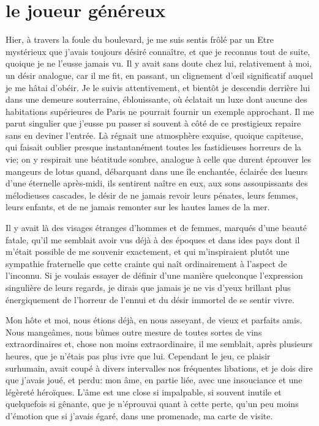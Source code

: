 \quebra\section[Le joueur généreux]{le joueur généreux}

Hier, à travers la foule du boulevard, je me suis sentis frôlé par un
Etre mystérieux que j’avais toujours désiré connaître,
et que je reconnus tout de suite, quoique je ne
l’eusse jamais vu. Il y avait sans doute chez lui,
relativement à moi, un désir analogue, car il me fit, en passant, un
clignement d’\oe il significatif auquel je me hâtai
d’obéir. Je le suivis attentivement, et bientôt je
descendis derrière lui dans une demeure souterraine, éblouissante, où
éclatait un luxe dont aucune des habitations supérieures de Paris ne
pourrait fournir un exemple approchant. Il me parut singulier que
j’eusse pu passer si souvent à côté de ce prestigieux
repaire sans en deviner l’entrée. Là régnait une
atmosphère exquise, quoique capiteuse, qui faisait oublier presque
instantanément toutes les fastidieuses horreurs de la vie; on y
respirait une béatitude sombre, analogue à celle que durent éprouver
les mangeurs de lotus quand, débarquant dans une île enchantée,
éclairée des lueurs d’une éternelle après{}-midi, ils
sentirent naître en eux, aux sons assoupissants des mélodieuses
cascades, le désir de ne jamais revoir leurs pénates, leurs femmes,
leurs enfants, et de ne jamais remonter sur les hautes lames de la mer.

Il y avait là des visages étranges d’hommes et de
femmes, marqués d’une beauté fatale,
qu’il me semblait avoir vus déjà à des époques et dans
ides pays dont il m’était possible de me souvenir
exactement, et qui m’inspiraient plutôt une sympathie
fraternelle que cette crainte qui naît ordinairement à
l’aspect de l’inconnu. Si je voulais
essayer de définir d’une manière quelconque
l’expression singulière de leurs regards, je dirais
que jamais je ne vis d’yeux brillant plus
énergiquement de l’horreur de l’ennui
et du désir immortel de se sentir vivre.

Mon hôte et moi, nous étions déjà, en nous asseyant, de vieux et
parfaits amis. Nous mangeâmes, nous bûmes outre mesure de toutes sortes
de vins extraordinaires et, chose non moins extraordinaire, il me
semblait, après plusieurs heures, que je n’étais pas
plus ivre que lui. Cependant le jeu, ce plaisir surhumain, avait coupé
à divers intervalles nos fréquentes libations, et je dois dire que
j’avais joué, et perdu: mon âme, en partie liée, avec
une insouciance et une légèreté héroïques. L’âme est
une close si impalpable, si souvent inutile et quelquefois si gênante,
que je n’éprouvai quant à cette perte,
qu’un peu moins d’émotion que si
j’avais égaré, dans une promenade, ma carte de visite.

